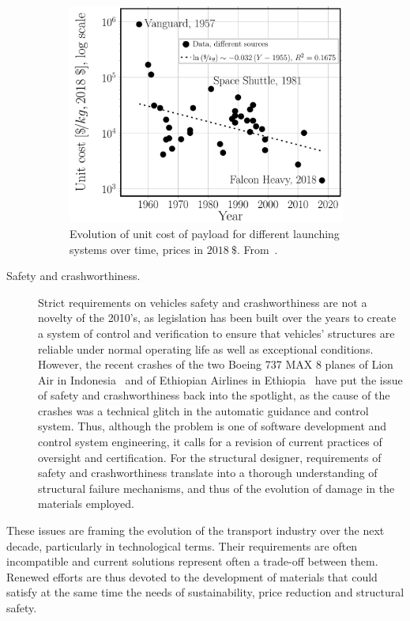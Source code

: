 \begin{description}
\begin{figure}[!h]
\includegraphics[width=0.9\textwidth]{pics/spacetravelcost.pdf}
\caption{Evolution of unit cost of payload for different launching systems over time, prices in $2018\ \$$. From~\cite{Jones2018}.}\label{chap1:fig:spacetravelcost}
\end{figure}

\item[Safety and crashworthiness.] Strict requirements on vehicles safety and crashworthiness are not a novelty of the 2010's, as legislation has been built over the years to create a system of control and verification to ensure that vehicles' structures are reliable under normal operating life as well as exceptional conditions. However, the recent crashes of the two Boeing 737 MAX 8 planes of Lion Air in Indonesia~\cite{aviationSafety2018} and of Ethiopian Airlines in Ethiopia~\cite{aviationSafety2019} have put the issue of safety and crashworthiness back into the spotlight, as the cause of the crashes was a technical glitch in the automatic guidance and control system. Thus, although the problem is one of software development and control system engineering, it calls for a revision of current practices of oversight and certification. For the structural designer, requirements of safety and crashworthiness translate into a thorough understanding of structural failure mechanisms, and thus of the evolution of damage in the materials employed.

\end{description}

These issues are framing the evolution of the transport industry over the next decade, particularly in technological terms. Their requirements are often incompatible and current solutions represent often a trade-off between them. Renewed efforts are thus devoted to the development of materials that could satisfy at the same time the needs of sustainability, price reduction and structural safety.

